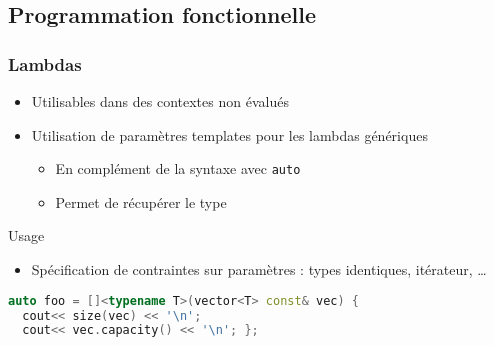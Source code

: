 \documentclass[C++.tex]{subfiles}
\begin{document}
\subsection*{Programmation fonctionnelle}
\begin{frame}[fragile]
	\frametitle{Lambdas}
	\begin{itemize}
		\item Utilisables dans des contextes non évalués


		\item Utilisation de paramètres templates pour les lambdas génériques
		\begin{itemize}
			\item En complément de la syntaxe avec \lstinline|auto|


			\item Permet de récupérer le type
		\end{itemize}
	\end{itemize}

	\begin{block}{Usage}
		\begin{itemize}
			\item Spécification de contraintes sur paramètres : types identiques, itérateur, \ldots
		\end{itemize}
	\end{block}

	\begin{lstlisting}[language=C++]
auto foo = []<typename T>(vector<T> const& vec) { 
  cout<< size(vec) << '\n';
  cout<< vec.capacity() << '\n'; };\end{lstlisting}


\end{frame}
\end{document}
